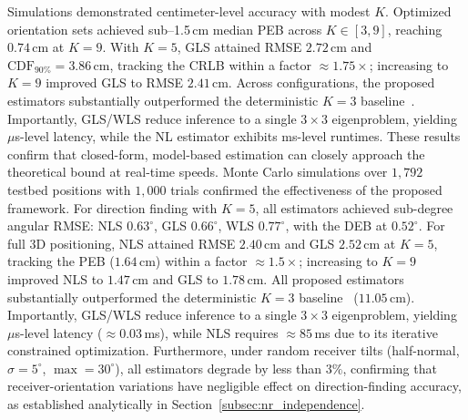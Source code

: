 \documentclass[journal]{IEEEtran}
\newcommand{\added}[1]{{\color{blue}#1}}
\newcommand{\deleted}[1]{{\color{red}#1}}
\begin{document}
\deleted{Simulations demonstrated centimeter-level accuracy with modest $K$. Optimized orientation sets achieved sub--1.5\,cm median PEB across $K\in[3,9]$, reaching $0.74\,\mathrm{cm}$ at $K=9$. With $K=5$, GLS attained RMSE $2.72\,\mathrm{cm}$ and $\mathrm{CDF}_{90\%}=3.86\,\mathrm{cm}$, tracking the CRLB within a factor $\approx1.75\times$; increasing to $K=9$ improved GLS to RMSE $2.41\,\mathrm{cm}$. 
Across configurations, the proposed estimators substantially outperformed the deterministic $K=3$ baseline~\cite{Chassagne2025}.
Importantly, GLS/WLS reduce inference to a single $3\times3$ eigenproblem, yielding $\mu$s-level latency, while the NL estimator exhibits ms-level runtimes. These results confirm that closed-form, model-based estimation can closely approach the theoretical bound at real-time speeds.}
\added{Monte Carlo simulations over $1{,}792$ testbed positions with $1{,}000$ trials confirmed the effectiveness of the proposed framework. For direction finding with $K{=}5$, all estimators achieved sub-degree angular RMSE: NLS $0.63^\circ$, GLS $0.66^\circ$, WLS $0.77^\circ$, with the DEB at $0.52^\circ$. For full 3D positioning, NLS attained RMSE $2.40$\,cm and GLS $2.52$\,cm at $K{=}5$, tracking the PEB ($1.64$\,cm) within a factor $\approx1.5\times$; increasing to $K{=}9$ improved NLS to $1.47$\,cm and GLS to $1.78$\,cm. All proposed estimators substantially outperformed the deterministic $K{=}3$ baseline~\cite{Chassagne2025} ($11.05$\,cm).
Importantly, GLS/WLS reduce inference to a single $3\times3$ eigenproblem, yielding $\mu$s-level latency ($\approx0.03$\,ms), while NLS requires $\approx85$\,ms due to its iterative constrained optimization. Furthermore, under random receiver tilts (half-normal, $\sigma{=}5^\circ$, $\max{=}30^\circ$), all estimators degrade by less than $3\%$, confirming that receiver-orientation variations have negligible effect on direction-finding accuracy, as established analytically in Section~\ref{subsec:nr_independence}.}
\end{document}
